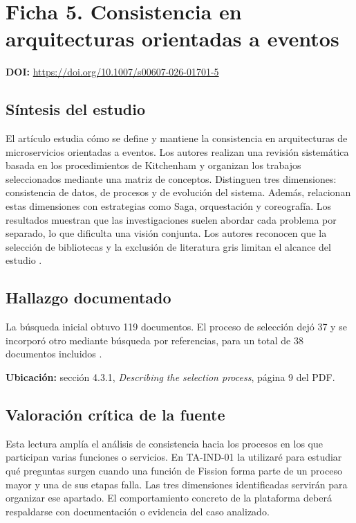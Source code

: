 \documentclass[11pt,a4paper]{article}
\newcommand{\tituloficha}[1]{\Needspace{5\baselineskip}\section*{#1}}
\newcommand{\doificha}[1]{\textbf{DOI:} \url{https://doi.org/#1}\par}
\begin{document}
\clearpage

\tituloficha{Ficha 5. Consistencia en arquitecturas orientadas a eventos}

\doificha{10.1007/s00607-026-01701-5}

\subsection*{Síntesis del estudio}

El artículo estudia cómo se define y mantiene la consistencia en
arquitecturas de microservicios orientadas a eventos. Los autores realizan
una revisión sistemática basada en los procedimientos de Kitchenham y
organizan los trabajos seleccionados mediante una matriz de conceptos.
Distinguen tres dimensiones: consistencia de datos, de procesos y de
evolución del sistema. Además, relacionan estas dimensiones con estrategias
como Saga, orquestación y coreografía. Los resultados muestran que las
investigaciones suelen abordar cada problema por separado, lo que dificulta
una visión conjunta. Los autores reconocen que la selección de bibliotecas y
la exclusión de literatura gris limitan el alcance del estudio
\cite{bacao_consistency_2026}.

\subsection*{Hallazgo documentado}

La búsqueda inicial obtuvo 119 documentos.
El proceso de selección dejó 37 y se incorporó otro
mediante búsqueda por referencias, para un total de
38 documentos incluidos
\cite{bacao_consistency_2026}.

\textbf{Ubicación:} sección 4.3.1,
\textit{Describing the selection process}, página 9 del PDF.

\subsection*{Valoración crítica de la fuente}

Esta lectura amplía el análisis de consistencia hacia los procesos en los
que participan varias funciones o servicios. En TA-IND-01 la utilizaré para
estudiar qué preguntas surgen cuando una función de Fission forma parte de
un proceso mayor y una de sus etapas falla. Las tres dimensiones
identificadas servirán para organizar ese apartado. El comportamiento
concreto de la plataforma deberá respaldarse con documentación o evidencia
del caso analizado.
\end{document}
